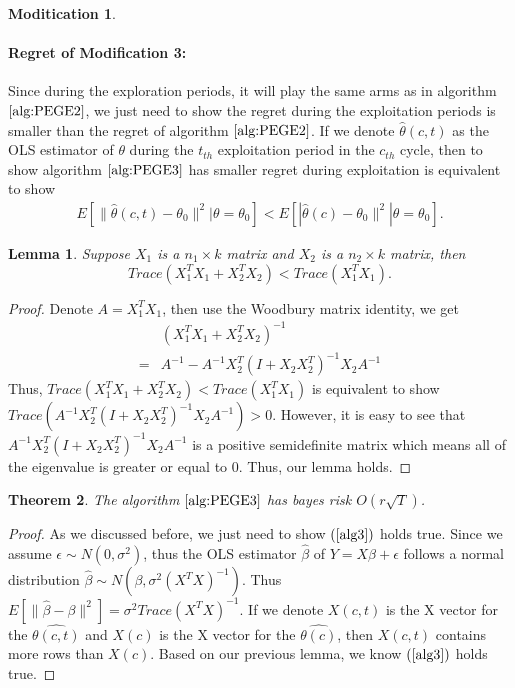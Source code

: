 \documentclass{article}
\newtheorem{theorem}{Theorem}
\newtheorem{lemma}[theorem]{Lemma}
\theoremstyle{plain}
\theoremstyle{definition}
\newtheorem{modification}{Moditication}
\begin{document}
\begin{modification}
\paragraph{Regret of Modification 3:}
Since during the exploration periods, it will play the same arms as in algorithm $\ref{alg:PEGE2}$, we just need to show the regret during the exploitation periods is smaller than the regret of algorithm $\ref{alg:PEGE2}$. If we denote $\hat{\theta}(c,t)$ as the OLS estimator of $\theta$ during the $t_{th}$ exploitation period in the $c_{th}$ cycle, then to show algorithm $\ref{alg:PEGE3}$ has smaller regret during exploitation is equivalent to show 
\begin{align}
E[\|\hat{\theta}(c,t)-\theta_{0}\|^{2}|\theta=\theta_{0}] < E[|\hat{\theta}(c)-\theta_{0}\|^{2}|\theta=\theta_{0}]. \label{alg3}
\end{align}
\begin{lemma}
Suppose $X_{1}$ is a $n_{1}\times k $ matrix and $X_{2}$ is a $n_{2}\times k$ matrix, then
\begin{equation}
Trace(X_{1}^{T}X_{1}+X_{2}^{T}X_{2}) < Trace(X_{1}^{T}X_{1}). \nonumber
\end{equation}
\end{lemma}
\begin{proof}
Denote $A=X_{1}^{T}X_{1}$, then use the Woodbury matrix identity, we get
\begin{align}
&(X_{1}^{T}X_{1}+X_{2}^{T}X_{2})^{-1} \nonumber \\
=& A^{-1}-A^{-1}X_{2}^{T}(I+X_{2}X_{2}^{T})^{-1}X_{2}A^{-1} \nonumber 
\end{align}
Thus, $Trace(X_{1}^{T}X_{1}+X_{2}^{T}X_{2}) < Trace(X_{1}^{T}X_{1})$ is equivalent to show $Trace(A^{-1}X_{2}^{T}(I+X_{2}X_{2}^{T})^{-1}X_{2}A^{-1})>0$. However, it is easy to see that $A^{-1}X_{2}^{T}(I+X_{2}X_{2}^{T})^{-1}X_{2}A^{-1}$ is a positive semidefinite matrix which means all of the eigenvalue is greater or equal to 0. Thus, our lemma holds.
\end{proof}

\begin{theorem}
The algorithm $\ref{alg:PEGE3}$ has bayes risk $O(r\sqrt{T})$.
\end{theorem}
\begin{proof}
As we discussed before, we just need to show $(\ref{alg3})$ holds true. Since we assume $\epsilon\sim N(0,\sigma^{2})$, thus the OLS estimator $\hat{\beta}$ of $Y=X\beta+\epsilon$ follows a normal distribution $\hat{\beta}\sim N(\beta,\sigma^{2}(X^{T}X)^{-1})$. Thus $E[\|\hat{\beta}-\beta\|^{2}]=\sigma^{2}Trace(X^{T}X)^{-1}$. If we denote $X(c,t)$ is the X vector for the $\hat{\theta(c,t)}$ and $X(c)$ is the X vector for the $\hat{\theta(c)}$, then $X(c,t)$ contains more rows than $X(c)$. Based on our previous lemma, we know $(\ref{alg3})$ holds true.
\end{proof}


\end{modification}
\end{document}
